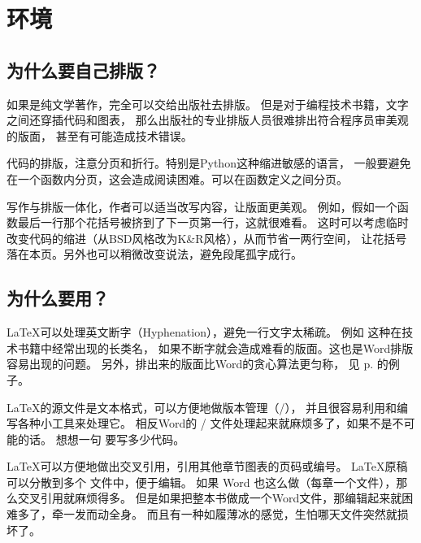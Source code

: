\chapter{环境}

\section{为什么要自己排版？}
\label{sec:whyTypesetting}

如果是纯文学著作，完全可以交给出版社去排版。
但是对于编程技术书籍，文字之间还穿插代码和图表，
那么出版社的专业排版人员很难排出符合程序员审美观的版面，
甚至有可能造成技术错误。


\begindot
\item 代码的排版，注意分页和折行。特别是Python这种缩进敏感的语言，
一般要避免在一个函数内分页，这会造成阅读困难。可以在函数定义之间分页。

\item 写作与排版一体化，作者可以适当改写内容，让版面更美观。
例如，假如一个函数最后一行那个花括号被挤到了下一页第一行，这就很难看。
这时可以考虑临时改变代码的缩进（从BSD风格改为K\&R风格），从而节省一两行空间，
让花括号落在本页。另外也可以稍微改变说法，避免段尾孤字成行。
\myenddot


\section{为什么要用？}
\begindot
\item \LaTeX 可以处理英文断字（Hyphenation），避免一行文字太稀疏。
例如 这种在技术书籍中经常出现的长类名，
如果不断字就会造成难看的版面。这也是Word排版容易出现的问题。
另外，排出来的版面比Word的贪心算法更匀称，
见 p.\pageref{ex:dynamicProgramming} 的例子。

\item \LaTeX 的源文件是文本格式，可以方便地做版本管理（/），
并且很容易利用和编写各种小工具来处理它。
相反Word的 / 文件处理起来就麻烦多了，如果不是不可能的话。
想想一句  要写多少代码。

\item \LaTeX 可以方便地做出交叉引用，引用其他章节图表的页码或编号。
\LaTeX 原稿可以分散到多个  文件中，便于编辑。
如果 Word 也这么做（每章一个文件），那么交叉引用就麻烦得多。
但是如果把整本书做成一个Word文件，那编辑起来就困难多了，牵一发而动全身。
而且有一种如履薄冰的感觉，生怕哪天文件突然就损坏了。
\myenddot

